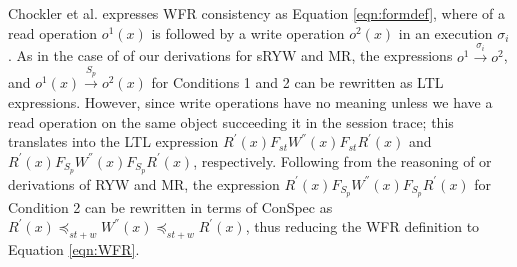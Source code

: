 \documentclass[journal,compsoc]{IEEEtran}
\begin{document}
\par  Chockler et al. expresses WFR consistency as Equation \ref{eqn:formdef},  %
  where of a read operation
   $\mathit{o}^1(x)$ is followed by a write operation  $\mathit{o}^2(x)$ in an execution $\sigma_i$. %
   As in the case of of our derivations for sRYW and MR, the expressions $\mathit{o}^1 \xrightarrow{\sigma_i} \mathit{o}^2$,
  and $\mathit{o}^1(x) \xrightarrow{S_p} \mathit{o}^2(x)$ for Conditions 1 and 2  can be rewritten as LTL expressions. However, since write operations have no meaning unless we have a read operation on the same object succeeding it in the session trace; this translates into the LTL expression  
   $R^{'}(x) F_\mathit{st} W^{''}(x) F_\mathit{st} R^{'}(x)$ and $R^{'}(x) F_{S_p} W^{''}(x) F_{S_p} R^{'}(x)$, respectively.  %
  Following from the reasoning of or derivations of  RYW and MR, the expression $R^{'}(x)  F_{S_p} W^{''}(x) F_{S_p} R^{'}(x)$ for Condition 2 can be rewritten in terms of ConSpec as  $R^{'}(x)  \preccurlyeq_{\mathit{st}+w} W^{''}(x) \preccurlyeq_{\mathit{st}+w} R^{'}(x)$,  thus reducing the WFR definition to Equation \ref{eqn:WFR}. 
\end{document}
